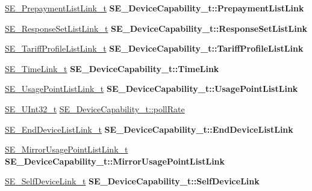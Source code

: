\begin{DoxyCompactItemize}
\hyperlink{structSE__PrepaymentListLink__t}{S\+E\+\_\+\+Prepayment\+List\+Link\+\_\+t} {\bfseries S\+E\+\_\+\+Device\+Capability\+\_\+t\+::\+Prepayment\+List\+Link}
\item 
\mbox{\label{group__DeviceCapability_gaa445fe7dd721176bc1f114eb20c70402}} 
\hyperlink{structSE__ResponseSetListLink__t}{S\+E\+\_\+\+Response\+Set\+List\+Link\+\_\+t} {\bfseries S\+E\+\_\+\+Device\+Capability\+\_\+t\+::\+Response\+Set\+List\+Link}
\item 
\mbox{\label{group__DeviceCapability_ga5e446e5cba7a199c4430ca529fda693e}} 
\hyperlink{structSE__TariffProfileListLink__t}{S\+E\+\_\+\+Tariff\+Profile\+List\+Link\+\_\+t} {\bfseries S\+E\+\_\+\+Device\+Capability\+\_\+t\+::\+Tariff\+Profile\+List\+Link}
\item 
\mbox{\label{group__DeviceCapability_gad95bce444c6d47c4068bcaffe1fe58a9}} 
\hyperlink{structSE__TimeLink__t}{S\+E\+\_\+\+Time\+Link\+\_\+t} {\bfseries S\+E\+\_\+\+Device\+Capability\+\_\+t\+::\+Time\+Link}
\item 
\mbox{\label{group__DeviceCapability_ga6773fa5ed7d51f88a0ebfebe0f15bdd3}} 
\hyperlink{structSE__UsagePointListLink__t}{S\+E\+\_\+\+Usage\+Point\+List\+Link\+\_\+t} {\bfseries S\+E\+\_\+\+Device\+Capability\+\_\+t\+::\+Usage\+Point\+List\+Link}
\item 
\hyperlink{group__UInt32_ga70bd4ecda3c0c85d20779d685a270cdb}{S\+E\+\_\+\+U\+Int32\+\_\+t} \hyperlink{group__DeviceCapability_gad92ad6a3b915fb56c09a651873754141}{S\+E\+\_\+\+Device\+Capability\+\_\+t\+::poll\+Rate}
\item 
\mbox{\label{group__DeviceCapability_ga053d7a634dd27a1115f6c122f952b6d1}} 
\hyperlink{structSE__EndDeviceListLink__t}{S\+E\+\_\+\+End\+Device\+List\+Link\+\_\+t} {\bfseries S\+E\+\_\+\+Device\+Capability\+\_\+t\+::\+End\+Device\+List\+Link}
\item 
\mbox{\label{group__DeviceCapability_ga0cbd5d13c8f30cefdecdd752c975178a}} 
\hyperlink{structSE__MirrorUsagePointListLink__t}{S\+E\+\_\+\+Mirror\+Usage\+Point\+List\+Link\+\_\+t} {\bfseries S\+E\+\_\+\+Device\+Capability\+\_\+t\+::\+Mirror\+Usage\+Point\+List\+Link}
\item 
\mbox{\label{group__DeviceCapability_gac6aa237aeccec891f28864920ba09fd3}} 
\hyperlink{structSE__SelfDeviceLink__t}{S\+E\+\_\+\+Self\+Device\+Link\+\_\+t} {\bfseries S\+E\+\_\+\+Device\+Capability\+\_\+t\+::\+Self\+Device\+Link}
\end{DoxyCompactItemize}


